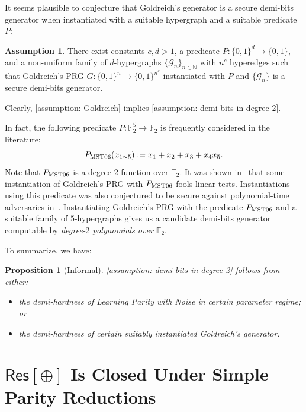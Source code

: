 \documentclass[10pt,a4paper]{article}
\newtheorem{proposition}[theorem]{Proposition}
\theoremstyle{definition}
\newtheorem{assumption}[theorem]{Assumption}
\theoremstyle{remark}
\newcommand{\Res}{\mathsf{Res}}
\newcommand{\calG}{\mathcal{G}}
\newcommand{\N}{\mathbb{N}}
\newcommand{\F}{\mathbb{F}}
\begin{document}
It seems plausible to conjecture that Goldreich's generator is a secure demi-bits generator when instantiated with a suitable hypergraph and a suitable predicate $P$:
\begin{assumption}\label{assumption: Goldreich}
    There exist constants $c, d > 1$, a predicate $P: \{0, 1\}^d \to \{0, 1\}$, and a non-uniform family of $d$-hypergraphs $\{\calG_n\}_{n\in\N}$ with $n^c$ hyperedges such that Goldreich's PRG $G: \{0, 1\}^n \to \{0, 1\}^{n^c}$ instantiated with $P$ and $\{\calG_n\}$ is a secure demi-bits generator.
\end{assumption}

Clearly, \autoref{assumption: Goldreich} implies \autoref{assumption: demi-bits in degree 2}.

In fact, the following predicate $P: \F_2^5\to \F_2$ is frequently considered in the literature:
\[P_{\rm MST06}(x_{1\sim 5}) := x_1 + x_2 + x_3 + x_4x_5.\]
Note that $P_{\rm MST06}$ is a degree-$2$ function over $\F_2$. It was shown in~\cite{DBLP:journals/rsa/MosselST06} that some instantiation of Goldreich's PRG with $P_{\rm MST06}$ fools linear tests. Instantiations using this predicate was also conjectured to be secure against polynomial-time adversaries in~\cite{DBLP:conf/tcc/BogdanovKR23}. Instantiating Goldreich's PRG with the predicate $P_{\rm MST06}$ and a suitable family of $5$-hypergraphs gives us a candidate demi-bits generator computable by \emph{degree-$2$ polynomials over $\F_2$}.





To summarize, we have:
\begin{proposition}[Informal]
    \autoref{assumption: demi-bits in degree 2} follows from either:\begin{itemize}
        \item the demi-hardness of Learning Parity with Noise in certain parameter regime; or
        \item the demi-hardness of certain suitably instantiated Goldreich's generator.
    \end{itemize}
\end{proposition}

\section{\texorpdfstring{$\Res[\oplus]$}{Res[2]} Is Closed Under Simple Parity Reductions}\label{sec: res parity}
\end{document}

